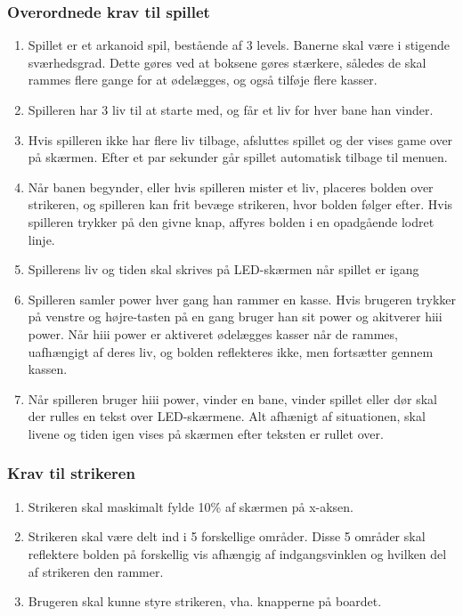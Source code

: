 \subsubsection{Overordnede krav til spillet}
\begin{enumerate}
\item Spillet er et arkanoid spil, bestående af 3 levels. Banerne skal være i stigende sværhedsgrad. Dette gøres ved at boksene gøres stærkere, således de skal rammes flere gange for at ødelægges, og også tilføje flere kasser.
\item Spilleren har 3 liv til at starte med, og får et liv for hver bane han vinder.
\item Hvis spilleren ikke har flere liv tilbage, afsluttes spillet og der vises game over på skærmen. Efter et par sekunder går spillet automatisk tilbage  til menuen.
\item Når banen begynder, eller hvis spilleren mister et liv, placeres bolden over strikeren, og spilleren kan frit bevæge strikeren, hvor bolden følger efter. Hvis spilleren trykker på den givne knap, affyres bolden i en opadgående lodret linje. 
\item Spillerens liv og tiden skal skrives på LED-skærmen når spillet er igang
\item Spilleren samler power hver gang han rammer en kasse. Hvis brugeren trykker på venstre og højre-tasten på en gang bruger han sit power og akitverer hiii power. Når hiii power er aktiveret ødelægges kasser når de rammes, uafhængigt af deres liv, og bolden reflekteres ikke, men fortsætter gennem kassen.
\item Når spilleren bruger hiii power, vinder en bane, vinder spillet eller dør skal der rulles en tekst over LED-skærmene. Alt afhænigt af situationen, skal livene og tiden igen vises på skærmen efter teksten er rullet over.
\end{enumerate}
\subsubsection{Krav til strikeren}
\begin{enumerate}
\item Strikeren skal maskimalt fylde 10\% af skærmen på x-aksen. 
\item  Strikeren skal være delt ind i 5 forskellige områder. Disse 5 områder skal reflektere bolden på forskellig vis afhængig af indgangsvinklen og hvilken del af strikeren den rammer. 
\item Brugeren skal kunne styre strikeren, vha. knapperne på boardet.
\end{enumerate}
\label{Ballkrav}
